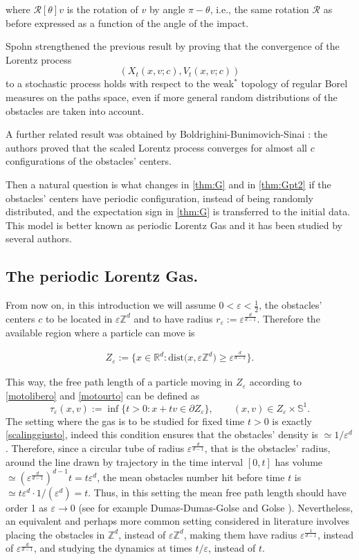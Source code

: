 \documentclass[a4paper,10pt,reqno]{amsart}
\numberwithin{equation}{subsection}
\numberwithin{figure}{subsection}
\begin{document}
where ${\mathcal R}[\theta]v$ is the rotation of $v$ by angle $\pi-\theta$, i.e., the same rotation ${\mathcal R}$ as before expressed as a function of the angle of the impact.

Spohn \cite{Spohn1978} strengthened the previous result by proving that the convergence of the Lorentz process
\[
(X_t(x,v;c),V_t(x,v;c))
\]
to a stochastic process holds with respect to the weak$^*$ topology of regular Borel measures on the paths space, even if more general random distributions of the obstacles are taken into account.

A further related result was obtained by Boldrighini-Bunimovich-Sinai \cite{BBS1983}: the authors proved that the scaled Lorentz process converges for almost all $c$ configurations of the obstacles' centers.

Then a natural question is what changes in \eqref{thm:G} and in \eqref{thm:Gpt2} if the obstacles' centers have periodic configuration, instead of being randomly distributed, and the expectation sign in \eqref{thm:G} is transferred to the initial data. This model is better known as periodic Lorentz Gas and it has been studied by several authors.

\subsection{The periodic Lorentz Gas.}
From now on, in this introduction we will assume $0<\varepsilon<\frac{1}{2}$, the obstacles' centers $c$ to be located in $\varepsilon\mathbb{Z}^d$ and to have radius $r_{\varepsilon}:=\varepsilon^{\frac{d}{d-1}}$. Therefore the available region where a particle can move is

\begin{align}\label{scalinggiusto}
Z_{\varepsilon}:=\{x\in\mathbb{R}^d:\textrm{dist(}x,\varepsilon\mathbb{Z}^d\textrm{)}\geq\varepsilon^{\frac{d}{d-1}}\}.
\end{align}

This way, the free path length of a particle moving in $Z_{\varepsilon}$ according to \eqref{motolibero} and \eqref{motourto} can be defined as
\[
\tau_{\varepsilon}(x,v):=\inf\{t>0:x+tv\in\partial Z_{\varepsilon}\},\qquad(x,v)\in Z_{\varepsilon}\times\mathbb{S}^1.
\]
The setting where the gas is to be studied for fixed time $t>0$ is exactly \eqref{scalinggiusto}, indeed this condition ensures that the obstacles' density is $\simeq1/\varepsilon^d$. Therefore, since a circular tube of radius $\varepsilon^{\frac{d}{d-1}}$, that is the obstacles' radius, around the line drawn by trajectory in the time interval $[0,t]$ has volume $\simeq(\varepsilon^{\frac{d}{d-1}})^{d-1}t=t\varepsilon^d$, the mean obstacles number hit before time $t$ is $\simeq t\varepsilon^d\cdot1/(\varepsilon^d)=t$. Thus, in this setting the mean free path length should have order 1 as $\varepsilon\to0$ (see for example Dumas-Dumas-Golse \cite{DDG1996} and Golse \cite{Golse2009}). Nevertheless, an equivalent and perhaps more common setting considered in literature involves placing the obstacles in $\mathbb{Z}^d$, instead of $\varepsilon\mathbb{Z}^d$, making them have radius $\varepsilon^{\frac{1}{d-1}}$, instead of $\varepsilon^{\frac{d}{d-1}}$, and studying the dynamics at times $t/\varepsilon$, instead of $t$.
\newline
\end{document}
